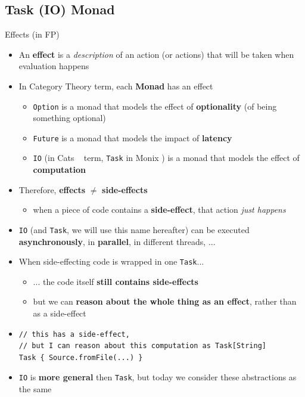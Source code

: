 \documentclass[presentation, 9pt]{beamer}\mode<presentation>{\usetheme{AMSBolognaFC}}
\begin{document}
\subsection{Task (IO) Monad}
\begin{frame}[fragile]{Effects (in FP)}
	\begin{itemize}
		\item An \textbf{effect} is a \emph{description} of an action (or actions) that will be taken when evaluation happens
		\item In Category Theory term, each \textbf{Monad} has an effect
		\begin{itemize}
			\item \texttt{Option} is a monad that models the effect of \textbf{optionality} (of being something optional)
		\item \texttt{Future} is a monad that models the impact of \textbf{latency}
		\item \texttt{IO} (in Cats ~\href{https://typelevel.org/cats/}{\faLink} term, \texttt{Task} in Monix \href{https://monix.io/}{\faLink}) is a monad that models the effect of \textbf{computation}
		\end{itemize}
		\item Therefore, \textbf{effects} $\neq$ \textbf{side-effects}
		\begin{itemize}
			\item when a piece of code contains a \textbf{side-effect}, that action \emph{just happens}
		\end{itemize}
		\item \texttt{IO} (and \texttt{Task}, we will use this name hereafter) can be executed \textbf{asynchronously}, in \textbf{parallel}, in different threads, ...
	\item {} When side-effecting code is wrapped in one \texttt{Task}...
		\begin{itemize}
			 \item ... the code itself \textbf{still contains side-effects} 
			 \item but we can \textbf{reason about the whole thing as an effect}, rather than as a side-effect
	\end{itemize}
		\item[] 	\begin{tcolorbox}[left=0pt, top=0pt, bottom=0pt]
			\begin{verbatim}
// this has a side-effect, 
// but I can reason about this computation as Task[String]
Task { Source.fromFile(...) } 
			\end{verbatim}
		\end{tcolorbox}
		\item {} \texttt{IO} is \textbf{more general} then \texttt{Task}, but today we consider these abstractions as the same
	\end{itemize}
\end{frame}
\end{document}
